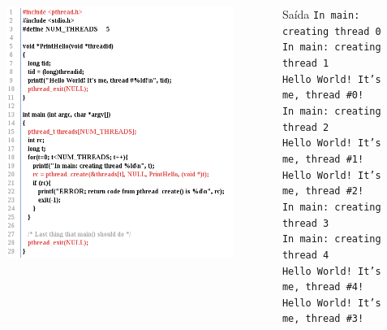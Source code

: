 \documentclass[10pt, xcolor=x11names]{beamer}
\begin{document}
\begin{frame}

	\begin{columns}
			\begin{figure}
				\includegraphics[width=1.2\linewidth]{img/code-thread.png}
			\end{figure}
		

		\begin{block}{Saída}
		\footnotesize
			\texttt{In main: creating thread 0\\
				In main: creating thread 1\\
				Hello World! It's me, thread \#0!\\
				In main: creating thread 2\\
				Hello World! It's me, thread \#1!\\
				Hello World! It's me, thread \#2!\\
				In main: creating thread 3\\
				In main: creating thread 4\\
				Hello World! It's me, thread \#4!\\
				Hello World! It's me, thread \#3!
			}
			
		\end{block}
		
	\end{columns}
	
\end{frame}
\end{document}
